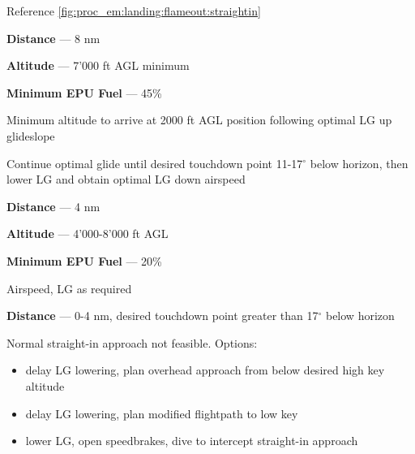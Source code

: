 \begin{tcoloritemize}
    Reference \cref{fig:proc_em:landing:flameout:straightin}

    \blueitem[Point A]
    \textbf{Distance} --- 8 nm 

    \medskip
    \textbf{Altitude} --- 7'000 ft AGL minimum

    \medskip
    \textbf{Minimum EPU Fuel} --- 45\%

    \bigskip
    Minimum altitude to arrive at 2000 ft AGL position following optimal LG up glideslope 

    \medskip

    Continue optimal glide until desired touchdown point
    11-17$^\circ$ below horizon, 
    then lower LG and obtain optimal LG down airspeed

    \blueitem[Point B]
    \textbf{Distance} --- 4 nm 

    \medskip
    \textbf{Altitude} --- 4'000-8'000 ft AGL

    \medskip
    \textbf{Minimum EPU Fuel} --- 20\%

    \bigskip
    Airspeed, LG as required

    \blueitem[Area C]
    \textbf{Distance} --- 0-4 nm, desired touchdown point greater than 17$^\circ$ below horizon

    \bigskip
    Normal straight-in approach not feasible. Options:
    \begin{itemize}
        \item delay LG lowering, plan overhead approach from below desired high key altitude
        \item delay LG lowering, plan modified flightpath to low key
        \item lower LG, open speedbrakes, dive to intercept straight-in approach
    \end{itemize}
\end{tcoloritemize}

